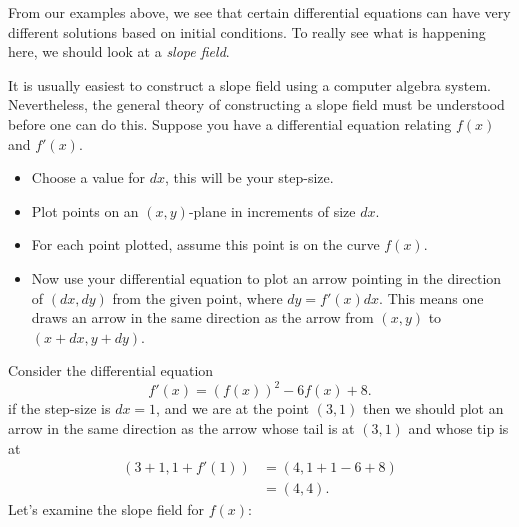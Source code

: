 From our examples above, we see that certain differential equations
can have very different solutions based on initial conditions. To
really see what is happening here, we should look at a \textit{slope
  field}.

\begin{procedureForConstructingASlopeField}
It is usually easiest to construct a slope field using a computer
algebra system. Nevertheless, the general theory of constructing a
slope field must be understood before one can do this.  Suppose you
have a differential equation relating $f(x)$ and $f'(x)$.
\begin{itemize}
\item Choose a value for $dx$, this will be your step-size.
\item Plot points on an $(x,y)$-plane in increments of size $dx$. 
\item For each point plotted, assume this point is on the curve $f(x)$. 
\item Now use your differential equation to plot an arrow pointing in
  the direction of $(dx,dy)$ from the given point, where $dy =
  f'(x)dx$. This means one draws an arrow in the same direction as the
  arrow from $(x,y)$ to $(x + dx, y + dy)$.
\end{itemize}
\end{procedureForConstructingASlopeField}

Consider the differential equation
\[
f'(x) = \left(f(x)\right)^2 - 6f(x) + 8.
\]
if the step-size is $dx =1$, and we are at the point $(3,1)$ then we
should plot an arrow in the same direction as the arrow whose tail is
at $(3,1)$ and whose tip is at
\begin{align*}
(3+1,1 + f'(1))  &= (4, 1 +1 -6+8)\\
&= (4,4).
\end{align*}
Let's examine the slope field for $f(x)$:

{\def\length{sqrt(1+(y^2-6*y+8)^2)}
}

